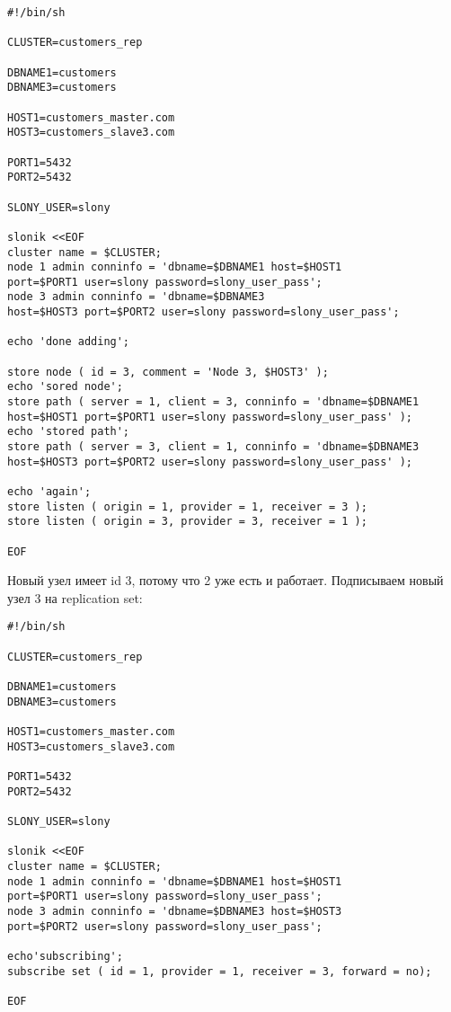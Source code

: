 \begin{lstlisting}[label=lst:slony14,caption=Общие задачи]
#!/bin/sh

CLUSTER=customers_rep

DBNAME1=customers
DBNAME3=customers

HOST1=customers_master.com
HOST3=customers_slave3.com

PORT1=5432
PORT2=5432

SLONY_USER=slony

slonik <<EOF
cluster name = $CLUSTER;
node 1 admin conninfo = 'dbname=$DBNAME1 host=$HOST1
port=$PORT1 user=slony password=slony_user_pass';
node 3 admin conninfo = 'dbname=$DBNAME3
host=$HOST3 port=$PORT2 user=slony password=slony_user_pass';

echo 'done adding';

store node ( id = 3, comment = 'Node 3, $HOST3' );
echo 'sored node';
store path ( server = 1, client = 3, conninfo = 'dbname=$DBNAME1
host=$HOST1 port=$PORT1 user=slony password=slony_user_pass' );
echo 'stored path';
store path ( server = 3, client = 1, conninfo = 'dbname=$DBNAME3
host=$HOST3 port=$PORT2 user=slony password=slony_user_pass' );

echo 'again';
store listen ( origin = 1, provider = 1, receiver = 3 );
store listen ( origin = 3, provider = 3, receiver = 1 );

EOF
\end{lstlisting}

Новый узел имеет id 3, потому что 2 уже есть и работает. Подписываем новый узел 3 на replication set:

\begin{lstlisting}[label=lst:slony15,caption=Общие задачи]
#!/bin/sh

CLUSTER=customers_rep

DBNAME1=customers
DBNAME3=customers

HOST1=customers_master.com
HOST3=customers_slave3.com

PORT1=5432
PORT2=5432

SLONY_USER=slony

slonik <<EOF
cluster name = $CLUSTER;
node 1 admin conninfo = 'dbname=$DBNAME1 host=$HOST1
port=$PORT1 user=slony password=slony_user_pass';
node 3 admin conninfo = 'dbname=$DBNAME3 host=$HOST3
port=$PORT2 user=slony password=slony_user_pass';

echo'subscribing';
subscribe set ( id = 1, provider = 1, receiver = 3, forward = no);

EOF
\end{lstlisting}

